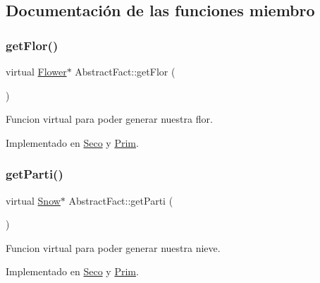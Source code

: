\subsection{Documentación de las funciones miembro}
\mbox{\label{classAbstractFact_a9ee9f34bc189886b24e325ff2412a1d9}} 
\subsubsection{\texorpdfstring{get\+Flor()}{getFlor()}}
{\footnotesize\ttfamily virtual \hyperlink{classFlower}{Flower}$\ast$ Abstract\+Fact\+::get\+Flor (\begin{DoxyParamCaption}{ }\end{DoxyParamCaption})\hspace{0.3cm}{\ttfamily [pure virtual]}}

Funcion virtual para poder generar nuestra flor. 

Implementado en \hyperlink{classSeco_a91092401b16231a926255323e89c6412}{Seco} y \hyperlink{classPrim_a92e3d118382a67173d008d5d82e4798c}{Prim}.

\mbox{\label{classAbstractFact_a7b642a7fe5615f7103dd7d1ab4c801d9}} 
\subsubsection{\texorpdfstring{get\+Parti()}{getParti()}}
{\footnotesize\ttfamily virtual \hyperlink{classSnow}{Snow}$\ast$ Abstract\+Fact\+::get\+Parti (\begin{DoxyParamCaption}{ }\end{DoxyParamCaption})\hspace{0.3cm}{\ttfamily [pure virtual]}}

Funcion virtual para poder generar nuestra nieve. 

Implementado en \hyperlink{classSeco_acd61763141ecdb895062cdde7defa800}{Seco} y \hyperlink{classPrim_ae2c1e853547a33662bd00baff26d67f8}{Prim}.

\mbox{\label{classAbstractFact_a37e763c0a454db79c61f229d33b72c73}} 
